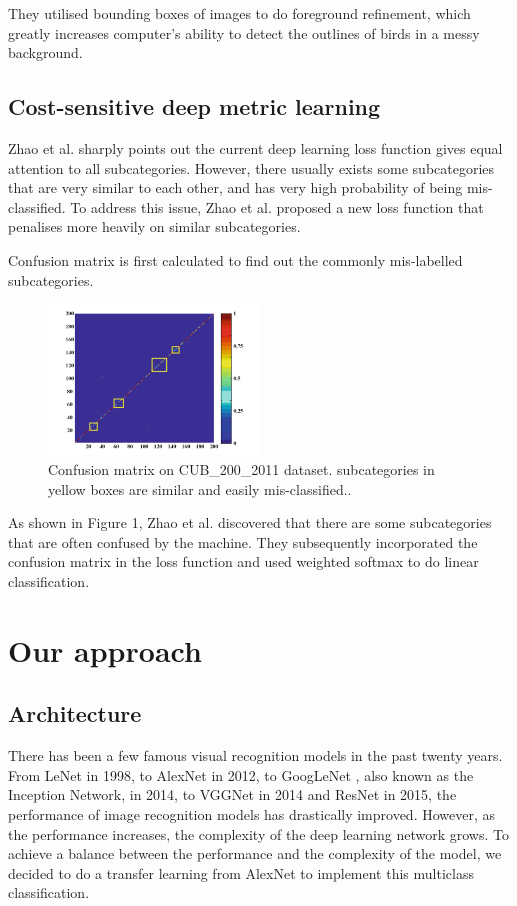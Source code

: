 \documentclass[letterpaper, 12pt]{article}
\begin{document}
They utilised bounding boxes of images to do foreground refinement, which greatly increases computer's ability
to detect the outlines of birds in a messy background.

\subsection{Cost-sensitive deep metric learning}
Zhao et al. \cite{Zhao} sharply points out the current deep learning loss function gives equal attention to all
subcategories. However, there usually exists some subcategories that are very similar to each other, and has very
high probability of being mis-classified. To address this issue, Zhao et al. \cite{Zhao} proposed a new loss function
that penalises more heavily on similar subcategories.

Confusion matrix is first calculated to find out the commonly mis-labelled subcategories.
\begin{figure}
    \begin{center}
        \includegraphics[width=0.5\textwidth]{confusion_matrix}
        \caption{Confusion matrix on CUB\_200\_2011 dataset. subcategories in yellow boxes are similar and easily mis-classified.\cite{Zhao}.}
    \end{center}
\end{figure}
As shown in Figure 1, Zhao et al. discovered that there are some subcategories that are often confused by the machine. They
subsequently incorporated the confusion matrix in the loss function and used weighted softmax to do linear classification.

\section{Our approach}
\subsection{Architecture}
There has been a few famous visual recognition models in the past twenty years.
From LeNet \cite{lecun1998gradient} in 1998, to AlexNet \cite{Alex} in 2012,
to GoogLeNet \cite{szegedy2015going}, also known as the Inception Network, in 2014,
to VGGNet \cite{simonyan2014very} in 2014 and ResNet \cite{he2016deep} in 2015, the
performance of image recognition models has drastically improved. However, as the performance
increases, the complexity of the deep learning network grows. To achieve a balance between
the performance and the complexity of the model, we decided to do a transfer learning
from AlexNet to implement this multiclass classification.
\end{document}
